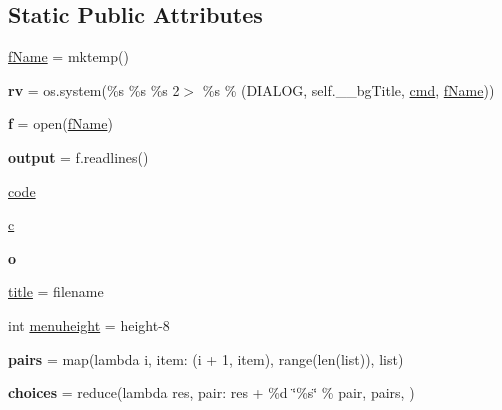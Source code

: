 \subsection*{Static Public Attributes}
\begin{DoxyCompactItemize}
\item 
\hyperlink{classdialog_1_1_dialog_a2da7c4ce546ef9e24ff1af7c01590a91}{f\+Name} = mktemp()
\item 
{\bfseries rv} = os.\+system(\textquotesingle{}\%s \%s \%s 2$>$ \%s\textquotesingle{} \% (D\+I\+A\+L\+OG, self.\+\_\+\+\_\+bg\+Title, \hyperlink{classdialog_1_1_dialog_ab6a920ce7ea89873b4dfe4f8a2aa57a4}{cmd}, \hyperlink{classdialog_1_1_dialog_a2da7c4ce546ef9e24ff1af7c01590a91}{f\+Name}))\hypertarget{classdialog_1_1_dialog_a4cbee250530a3642b62378401f02eacf}{}\label{classdialog_1_1_dialog_a4cbee250530a3642b62378401f02eacf}

\item 
{\bfseries f} = open(\hyperlink{classdialog_1_1_dialog_a2da7c4ce546ef9e24ff1af7c01590a91}{f\+Name})\hypertarget{classdialog_1_1_dialog_a9a1a2ebd59c83dbcb461f468f4090a9f}{}\label{classdialog_1_1_dialog_a9a1a2ebd59c83dbcb461f468f4090a9f}

\item 
{\bfseries output} = f.\+readlines()\hypertarget{classdialog_1_1_dialog_a79829d601c10994b652ed5eaf6eeca74}{}\label{classdialog_1_1_dialog_a79829d601c10994b652ed5eaf6eeca74}

\item 
\hyperlink{classdialog_1_1_dialog_ab04de1cc408c62ca48ca5bdf13e86a3c}{code}
\item 
\hyperlink{classdialog_1_1_dialog_a21e1495c999a2d39c6af16dec6eb422d}{c}
\item 
{\bfseries o}\hypertarget{classdialog_1_1_dialog_a3d0d7ebee89c26ac9c959f2e740bf9e7}{}\label{classdialog_1_1_dialog_a3d0d7ebee89c26ac9c959f2e740bf9e7}

\item 
\hyperlink{classdialog_1_1_dialog_a0ba5ed1f2029a13c537ea89ace62176a}{title} = filename
\item 
int \hyperlink{classdialog_1_1_dialog_ade186a1a950a0a06959dc36b278d7d02}{menuheight} = height-\/8
\item 
{\bfseries pairs} = map(lambda i, item\+: (i + 1, item), range(len(list)), list)\hypertarget{classdialog_1_1_dialog_ab08ac569150e0f098b08e84f76b59561}{}\label{classdialog_1_1_dialog_ab08ac569150e0f098b08e84f76b59561}

\item 
{\bfseries choices} = reduce(lambda res, pair\+: res + \textquotesingle{}\%d \char`\"{}\%s\char`\"{} \textquotesingle{} \% pair, pairs, \textquotesingle{}\textquotesingle{})\hypertarget{classdialog_1_1_dialog_a499fabd296d05b0c5eb7ebeac284f711}{}\label{classdialog_1_1_dialog_a499fabd296d05b0c5eb7ebeac284f711}


\end{DoxyCompactItemize}

